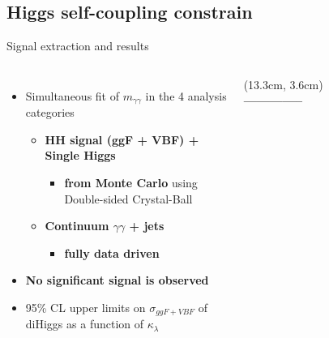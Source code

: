 \subsection{Higgs self-coupling constrain}

\begin{frame}{Signal extraction and results}

\begin{columns}
\begin{itemize}
    \item Simultaneous fit of \textbf{$m_{\gamma\gamma}$} in the 4 analysis categories
    \begin{itemize}
        \item \textbf{\textcolor{HHred}{HH signal} (ggF + VBF) + \textcolor{HHred}{Single Higgs}}
        \begin{itemize}
            \item \textbf{from Monte Carlo} using Double-sided Crystal-Ball
        \end{itemize}
       \item \textbf{\textcolor{HHturquoise_d}{Continuum $\gamma\gamma$ + jets}}
       \begin{itemize}
           \item \textbf{fully data driven}
       \end{itemize}
    \end{itemize}
    \item \textbf{\textcolor{HHred}{No significant signal is observed}}
    \item 95\% CL upper limits on $\sigma_{ggF+VBF}$ of diHiggs as a function of $\kappa_{\lambda}$
\end{itemize}

\begin{textblock*}{5cm}(13.3cm, 3.6cm) %
   \textbf{\textcolor{HHred}{--------------}}
\end{textblock*}
\begin{figure}
    \centering
\end{figure}


\end{columns}
\end{frame}
